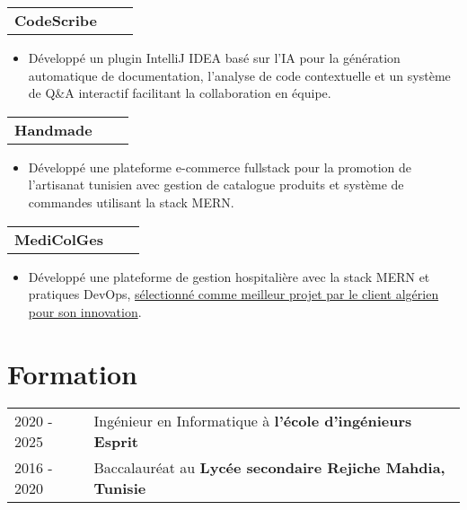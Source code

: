 \documentclass[a4paper,11pt]{article}
\makeatletter
\newenvironment{jobshort}[2]
    {
    \begin{tabularx}{\linewidth}{@{}l X r@{}}
    \textbf{#1} & \hfill &  #2 \\[2.75pt]
    \end{tabularx}
    \begin{minipage}[t]{\linewidth}
    \begin{itemize}[nosep,after=\strut, leftmargin=1em, itemsep=2pt]
    }
    {
    \end{itemize}
    \end{minipage}
    }
\makeatother
\begin{document}
\begin{jobshort}{CodeScribe}{}
\item Développé un plugin IntelliJ IDEA basé sur l'IA pour la génération automatique de documentation, l'analyse de code contextuelle et un système de Q\&A interactif facilitant la collaboration en équipe.
\end{jobshort}
\vspace{-1pt}
\begin{jobshort}{Handmade}{}
\item Développé une plateforme e-commerce fullstack pour la promotion de l'artisanat tunisien avec gestion de catalogue produits et système de commandes utilisant la stack MERN.
\end{jobshort}
\vspace{-1pt}
\begin{jobshort}{MediColGes}{}
\item Développé une plateforme de gestion hospitalière avec la stack MERN et pratiques DevOps, \href{https://drive.google.com/file/d/1gWNv6cd-rV3e9UC0t1IIyUFB63efAkBR/view}{sélectionné comme meilleur projet par le client algérien pour son innovation}.
\end{jobshort}

\vspace{-8pt}
\section{Formation}
\begin{tabularx}{\linewidth}{@{}l X@{}}	
2020 - 2025 & Ingénieur en Informatique à \textbf{l'école d'ingénieurs Esprit} \\

2016 - 2020 & Baccalauréat au \textbf{Lycée secondaire Rejiche Mahdia, Tunisie} \\
\end{tabularx}

\end{document}
